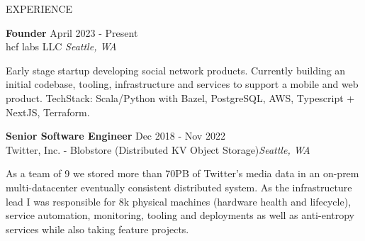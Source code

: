 

\begin{rSection}{EXPERIENCE}
    
\begin{mdframed}[linewidth=2,linecolor=red, innertopmargin=1em, innerbottommargin=1em, topline=false, rightline=false, bottomline=false]
\textbf{Founder} \hfill April 2023 - Present\\
hcf labs LLC \hfill \textit{Seattle, WA}

Early stage startup developing social network products. Currently building an initial codebase, tooling, infrastructure and services to support a mobile and web product. TechStack: Scala/Python with Bazel, PostgreSQL, AWS, Typescript + NextJS, Terraform.
\end{mdframed}

\begin{mdframed}[linewidth=2,linecolor=blue, innertopmargin=1em, innerbottommargin=1em, topline=false, rightline=false, bottomline=false]
\textbf{Senior Software Engineer} \hfill Dec 2018 - Nov 2022\\
Twitter, Inc. - Blobstore (Distributed KV Object Storage)\hfill \textit{Seattle, WA}

As a team of 9 we stored more than 70PB of Twitter's media data in an on-prem multi-datacenter eventually consistent distributed system. As the infrastructure lead I was responsible for 8k physical machines (hardware health and lifecycle), service automation, monitoring, tooling and deployments as well as anti-entropy services while also taking feature projects. 


\end{mdframed}
\end{rSection}
